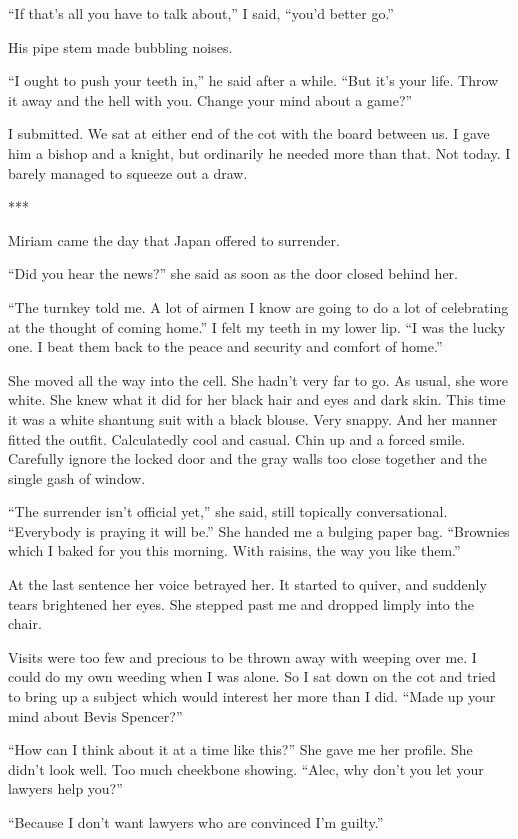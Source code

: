{“If that’s all you have to talk about,” I said, “you’d better go.”

His pipe stem made bubbling noises.

“I ought to push your teeth in,” he said after a while. “But it’s your life. Throw it away and the hell with you. Change your mind about a game?”

I submitted. We sat at either end of the cot with the board between us. I gave him a bishop and a knight, but ordinarily he needed more than that. Not today. I barely managed to squeeze out a draw.

***

Miriam came the day that Japan offered to surrender.

“Did you hear the news?” she said as soon as the door closed behind her.

“The turnkey told me. A lot of airmen I know are going to do a lot of celebrating at the thought of coming home.” I felt my teeth in my lower lip. “I was the lucky one. I beat them back to the peace and security and comfort of home.”

She moved all the way into the cell. She hadn’t very far to go. As usual, she wore white. She knew what it did for her black hair and eyes and dark skin. This time it was a white shantung suit with a black blouse. Very snappy. And her manner fitted the outfit. Calculatedly cool and casual. Chin up and a forced smile. Carefully ignore the locked door and the gray walls too close together and the single gash of window.

“The surrender isn’t official yet,” she said, still topically conversational. “Everybody is praying it will be.” She handed me a bulging paper bag. “Brownies which I baked for you this morning. With raisins, the way you like them.”

At the last sentence her voice betrayed her. It started to quiver, and suddenly tears brightened her eyes. She stepped past me and dropped limply into the chair.

Visits were too few and precious to be thrown away with weeping over me. I could do my own weeding when I was alone. So I sat down on the cot and tried to bring up a subject which would interest her more than I did. “Made up your mind about Bevis Spencer?”

“How can I think about it at a time like this?” She gave me her profile. She didn’t look well. Too much cheekbone showing. “Alec, why don’t you let your lawyers help you?”

“Because I don’t want lawyers who are convinced I’m guilty.”

}
